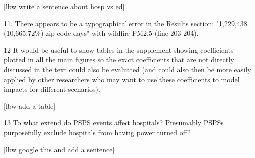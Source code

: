 [lbw write a sentence about hosp vs ed]

11.    There appears to be a typographical error in the Results section: "1,229,438 (10,665.72\%) zip code-days" with wildfire PM2.5 (line 203-204).

12   It would be useful to show tables in the supplement showing coefficients plotted in all the main figures so the exact coefficients that are not directly discussed in the text could also be evaluated (and could also then be more easily applied by other researchers who may want to use these coefficients to model impacts for different scenarios).

[lbw add a table]

13       To what extend do PSPS events affect hospitals? Presumably PSPSs purposefully exclude hospitals from having power turned off?

[lbw google this and add a sentence]
